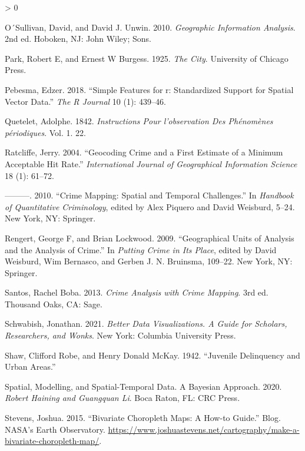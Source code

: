\documentclass[
]{book}
\newlength{\cslhangindent}
\newenvironment{CSLReferences}[2] %
 {%
  \setlength{\parindent}{0pt}
  \ifodd #1 \everypar{\setlength{\hangindent}{\cslhangindent}}\ignorespaces\fi
  \ifnum #2 > 0
  \setlength{\parskip}{#2\baselineskip}
  \fi
 }%
 {}
\begin{document}
\begin{CSLReferences}{1}{0}
\leavevmode\hypertarget{ref-OSullivan_2010}{}%
O´Sullivan, David, and David J. Unwin. 2010. \emph{Geographic Information Analysis}. 2nd ed. Hoboken, NJ: John Wiley; Sons.

\leavevmode\hypertarget{ref-Park_1925}{}%
Park, Robert E, and Ernest W Burgess. 1925. \emph{The City}. University of Chicago Press.

\leavevmode\hypertarget{ref-Pebesma_2018}{}%
Pebesma, Edzer. 2018. {``Simple Features for r: Standardized Support for Spatial Vector Data.''} \emph{The R Journal} 10 (1): 439--46.

\leavevmode\hypertarget{ref-Quetelet_1842}{}%
Quetelet, Adolphe. 1842. \emph{Instructions Pour l'observation Des Ph{é}nom{è}nes p{é}riodiques}. Vol. 1. 22.

\leavevmode\hypertarget{ref-Ratcliffe_2004}{}%
Ratcliffe, Jerry. 2004. {``Geocoding Crime and a First Estimate of a Minimum Acceptable Hit Rate.''} \emph{International Journal of Geographical Information Science} 18 (1): 61--72.

\leavevmode\hypertarget{ref-Ratcliffe_2010}{}%
---------. 2010. {``Crime Mapping: Spatial and Temporal Challenges.''} In \emph{Handbook of Quantitative Criminology}, edited by Alex Piquero and David Weisburd, 5--24. New York, NY: Springer.

\leavevmode\hypertarget{ref-Rengert_2009}{}%
Rengert, George F, and Brian Lockwood. 2009. {``Geographical Units of Analysis and the Analysis of Crime.''} In \emph{Putting Crime in Its Place}, edited by David Weisburd, Wim Bernasco, and Gerben J. N. Bruinsma, 109--22. New York, NY: Springer.

\leavevmode\hypertarget{ref-Boba_2013}{}%
Santos, Rachel Boba. 2013. \emph{Crime Analysis with Crime Mapping}. 3rd ed. Thousand Oaks, CA: Sage.

\leavevmode\hypertarget{ref-Schwabish_2021}{}%
Schwabish, Jonathan. 2021. \emph{Better Data Visualizations. A Guide for Scholars, Researchers, and Wonks}. New York: Columbia University Press.

\leavevmode\hypertarget{ref-Shaw_1942}{}%
Shaw, Clifford Robe, and Henry Donald McKay. 1942. {``Juvenile Delinquency and Urban Areas.''}

\leavevmode\hypertarget{ref-Haining_2020}{}%
Spatial, Modelling, and Spatial-Temporal Data. A Bayesian Approach. 2020. \emph{Robert Haining and Guangquan Li}. Boca Raton, FL: CRC Press.

\leavevmode\hypertarget{ref-Stevens_2015}{}%
Stevens, Joshua. 2015. {``Bivariate Choropleth Maps: A How-to Guide.''} Blog. NASA's Earth Observatory. \url{https://www.joshuastevens.net/cartography/make-a-bivariate-choropleth-map/}.


\end{CSLReferences}
\end{document}

